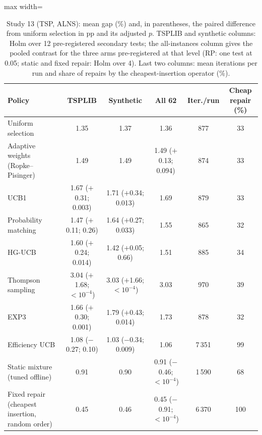 \begin{table}[t]
\caption{Study 13 (TSP, ALNS): mean gap (\%) and, in parentheses, the paired difference from uniform selection in pp and its adjusted $p$. TSPLIB and synthetic columns: Holm over 12 pre-registered secondary tests; the all-instances column gives the pooled contrast for the three arms pre-registered at that level (RP: one test at 0.05; static and fixed repair: Holm over 4). Last two columns: mean iterations per run and share of repairs by the cheapest-insertion operator (\%).}\label{tab:s13a}
\centering
\small
\begin{adjustbox}{max width=\linewidth}
\begin{tabular}{lccccc}
\toprule
Policy & TSPLIB & Synthetic & All 62 & Iter./run & Cheap repair (\%) \\
\midrule
Uniform selection & 1.35 & 1.37 & 1.36 & 877 & 33 \\
Adaptive weights (Ropke--Pisinger) & 1.49 & 1.49 & 1.49 ($+$0.13; 0.094) & 874 & 33 \\
UCB1 & 1.67 ($+$0.31; 0.003) & 1.71 ($+$0.34; 0.013) & 1.69 & 879 & 33 \\
Probability matching & 1.47 ($+$0.11; 0.26) & 1.64 ($+$0.27; 0.033) & 1.55 & 865 & 32 \\
HG-UCB & 1.60 ($+$0.24; 0.014) & 1.42 ($+$0.05; 0.66) & 1.51 & 885 & 34 \\
Thompson sampling & 3.04 ($+$1.68; \ensuremath{<10^{-4}}) & 3.03 ($+$1.66; \ensuremath{<10^{-4}}) & 3.03 & 970 & 39 \\
EXP3 & 1.66 ($+$0.30; 0.001) & 1.79 ($+$0.43; 0.014) & 1.73 & 878 & 32 \\
Efficiency UCB & 1.08 ($-$0.27; 0.10) & 1.03 ($-$0.34; 0.009) & 1.06 & 7\,351 & 99 \\
Static mixture (tuned offline) & 0.91 & 0.90 & 0.91 ($-$0.46; \ensuremath{<10^{-4}}) & 1\,590 & 68 \\
Fixed repair (cheapest insertion, random order) & 0.45 & 0.46 & 0.45 ($-$0.91; \ensuremath{<10^{-4}}) & 6\,370 & 100 \\
\bottomrule
\end{tabular}
\end{adjustbox}
\end{table}
